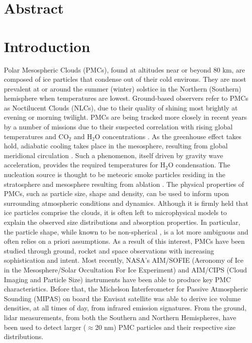 \documentclass[]{elsarticle}
\begin{document}
\section{Abstract}

\section{Introduction} \label{sec:introduction}
Polar Mesospheric Clouds (PMCs), found at altitudes near or beyond 80 km, are composed of ice particles that condense out of their cold environs. They are most prevalent at or around the summer (winter) solstice in the Northern (Southern) hemisphere when temperatures are lowest. Ground-based observers refer to PMCs as Noctilucent Clouds (NLCs), due to their quality of shining most brightly at evening or morning twilight. PMCs are being tracked more closely in recent years by a number of missions due to their suspected correlation with rising global temperatures and CO$_{2}$ and H$_{2}$O concentrations \cite{Lubken2018}. As the greenhouse effect takes hold, adiabatic cooling takes place in the mesosphere, resulting from global meridional circulation \cite{Suzuki2013}. Such a phenomenon, itself driven by gravity wave acceleration, provides the required temperatures for H$_{2}$O condensation. The nucleation source is thought to be meteoric smoke particles residing in the stratosphere and mesosphere resulting from ablation \cite{Hervig2012}. The physical properties of PMCs, such as particle size, shape and density, can be used to inform upon surrounding atmospheric conditions and dynamics. Although it is firmly held that ice particles comprise the clouds, it is often left to microphysical models to explain the observed size distributions \cite{Cossart1999} \cite{Bailey2015} and absorption properties. In particular, the particle shape, while known to be non-spherical \cite{Eremenko2005}, is a lot more ambiguous \cite{Rapp2007} and often relies on a priori assumptions. 
As a result of this interest, PMCs have been studied through ground, rocket and space observations with increasing sophistication and intent. Most recently, NASA's AIM/SOFIE (Aeronomy of Ice in the Mesosphere/Solar Occultation For Ice Experiment) and AIM/CIPS (Cloud Imaging and Particle Size) instruments have been able to produce key PMC characteristics. Before that, the Michelson Interferometer for Passive Atmospheric Sounding (MIPAS) on board the Envisat satellite was able to derive ice volume densities, at all times of day, from infrared emission signatures. From the ground, lidar measurements, from both the Southern \cite{Chu2013} and Northern \cite{Baumgarten2010} Hemispheres, have been used to detect larger ($\approx$20 nm) PMC particles and their respective size distributions.
\end{document}
